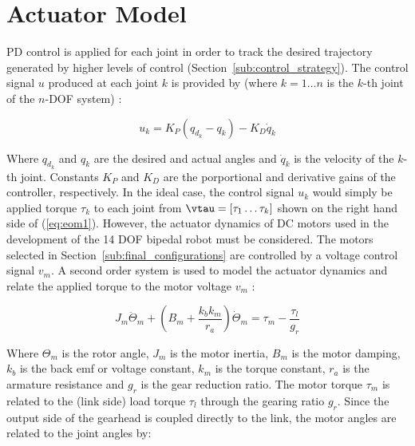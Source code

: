 

\section{Actuator Model} %
\label{sec:actuator_model}
PD control is applied for each joint in order to track the desired trajectory generated by higher levels of control (Section~\ref{sub:control_strategy}). The control signal $u$ produced at each joint $k$ is provided by (where $k = 1 \ldots n$ is the $k$-th joint of the $n$-DOF system) : 

\begin{equation}
	{u_k} = {K_P}({q_{d_k}} - {q_k}) - {K_D}{\dot q_k}
	\label{eq:pdcontrollaw}
\end{equation} 

Where ${q_{d_k}}$ and ${q_k}$ are the desired and actual angles and ${\dot q_k}$ is the velocity of the $k$-th joint. Constants ${K_P}$ and ${K_D}$ are the porportional and derivative gains of the controller, respectively. In the ideal case, the control signal ${u_k}$ would simply be applied torque ${\tau _k}$ to each joint from $\vtau = \left[\tau _1 \ldots \tau _k \right]$ shown on the right hand side of (\ref{eq:eom1}). However, the actuator dynamics of DC motors used in the development of the 14 DOF bipedal robot must be considered. The motors selected in Section~\ref{sub:final_configurations} are controlled by a voltage control signal $v_{m}$. A second order system is used to model the actuator dynamics and relate the applied torque to the motor voltage $v _m$ \cite{Spong2008}: 

\begin{equation}
	{J_m}{\ddot \Theta _m} + \left( {{B_m} + \frac{{{k_b}{k_m}}}{{{r_a}}}} \right)\dot \Theta _m  = {\tau _m} - \frac{{{\tau _l}}}{{{g_r}}}
	\label{eq:actdyn1}
\end{equation}

Where $\Theta _m$ is the rotor angle, $J_m$ is the motor inertia, $B_m$ is the motor damping, $k_b$ is the back emf or voltage constant, $k_m$ is the torque constant, $r_a$ is the armature resistance and $g_r$ is the gear reduction ratio. The motor torque $\tau _m$ is related to the (link side) load torque $\tau _l$ through the gearing ratio $g_r$. Since the output side of the gearhead is coupled directly to the link, the motor angles are related to the joint angles by: 

